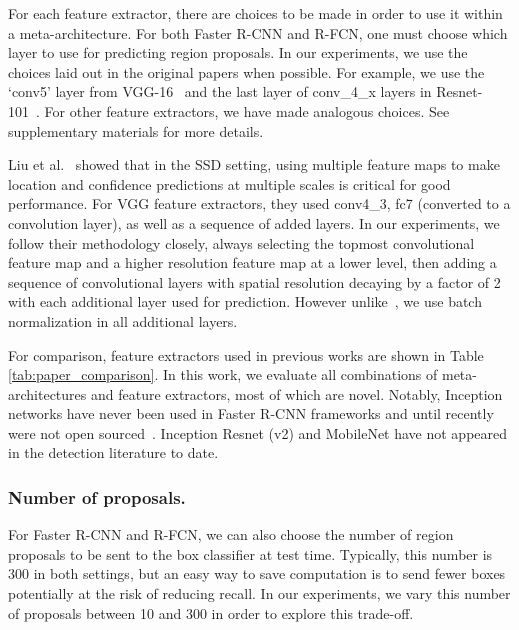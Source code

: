 \documentclass[10pt,twocolumn,letterpaper]{article}
\renewcommand{\paragraph}[1]{\subsubsection{#1}}
\begin{document}
For each feature extractor, there are choices to be made in order to use it within a meta-architecture.  For both Faster R-CNN and R-FCN, one must choose which layer to use for predicting region proposals.  In our experiments, we use the choices laid out in the original papers when possible.  For example, we use the `conv5' layer from VGG-16~\cite{ren2015faster} and the last layer of conv\_4\_x layers in Resnet-101~\cite{he2015deep}.  For other feature extractors, we have made analogous choices.  See supplementary materials for more details.

Liu et al.~\cite{liu2015ssd} showed that in the SSD setting,
using multiple feature maps to make location and confidence 
predictions at multiple scales is critical for good performance.
For VGG feature extractors, they used conv4\_3, fc7 (converted to a convolution layer),
as well as a sequence of added layers.  In our experiments, we follow
their methodology closely, always selecting the topmost convolutional feature map and a 
higher resolution feature map at a lower level, then adding a sequence of 
convolutional layers with spatial resolution decaying by a factor of 2
with each additional layer used for prediction.  However unlike~\cite{liu2015ssd}, we use batch normalization in all additional layers.

For comparison, feature extractors used in previous works are shown in Table \ref{tab:paper_comparison}. In this work, we evaluate all combinations of meta-architectures and feature extractors, most of which are novel. Notably, Inception networks have never been used in Faster R-CNN frameworks and until recently were not open sourced~\cite{silberman16}. Inception Resnet (v2) and MobileNet have not appeared in the detection literature to date. 

\paragraph{Number of proposals.}
For Faster R-CNN and R-FCN, we can also choose the number of region proposals to be sent to the box classifier at test time. 
Typically, this number is 300 in both settings, but an easy way to save computation is to send fewer boxes
potentially at the risk of reducing recall.  In our experiments, we vary this number of proposals between 10 and 300 in order
to explore this trade-off.
\end{document}
